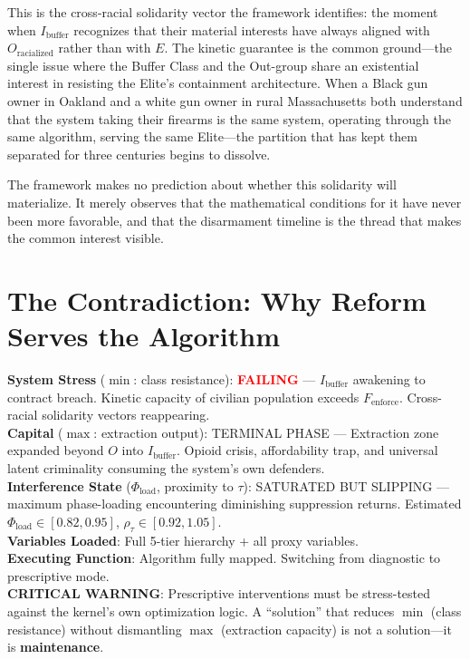 \documentclass[12pt,openany]{book}
\begin{document}
This is the cross-racial solidarity vector the framework identifies: the moment when $I_{\text{buffer}}$ recognizes that their material interests have always aligned with $O_{\text{racialized}}$ rather than with $E$. The kinetic guarantee is the common ground---the single issue where the Buffer Class and the Out-group share an existential interest in resisting the Elite's containment architecture. When a Black gun owner in Oakland and a white gun owner in rural Massachusetts both understand that the system taking their firearms is the same system, operating through the same algorithm, serving the same Elite---the partition that has kept them separated for three centuries begins to dissolve.

The framework makes no prediction about whether this solidarity will materialize. It merely observes that the mathematical conditions for it have never been more favorable, and that the disarmament timeline is the thread that makes the common interest visible.

\chapter{The Contradiction: Why Reform Serves the Algorithm}

\begin{tcolorbox}[colback=black!5, colframe=black!70, fonttitle=\bfseries\ttfamily, title=RUNTIME LOG: TESTING PRESCRIPTIVE INTERVENTIONS AGAINST KERNEL LOGIC]
\ttfamily\small
\textbf{System Stress} ($\min$: class resistance): \textcolor{red}{\textbf{FAILING}} --- $I_{\text{buffer}}$ awakening to contract breach. Kinetic capacity of civilian population exceeds $F_{\text{enforce}}$. Cross-racial solidarity vectors reappearing.\\
\textbf{Capital} ($\max$: extraction output): TERMINAL PHASE --- Extraction zone expanded beyond $O$ into $I_{\text{buffer}}$. Opioid crisis{,} affordability trap{,} and universal latent criminality consuming the system's own defenders.\\
\textbf{Interference State} ($\Phi_{\text{load}}$, proximity to $\tau$): SATURATED BUT SLIPPING --- maximum phase-loading encountering diminishing suppression returns. Estimated $\Phi_{\text{load}} \in [0.82, 0.95]$, $\rho_{\tau} \in [0.92, 1.05]$.\\
\textbf{Variables Loaded}: Full 5-tier hierarchy + all proxy variables.\\
\textbf{Executing Function}: Algorithm fully mapped. Switching from diagnostic to prescriptive mode.\\
\textbf{CRITICAL WARNING}: Prescriptive interventions must be stress-tested against the kernel's own optimization logic. A ``solution'' that reduces $\min$ (class resistance) without dismantling $\max$ (extraction capacity) is not a solution---it is \textbf{maintenance}.
\end{tcolorbox}
\end{document}

